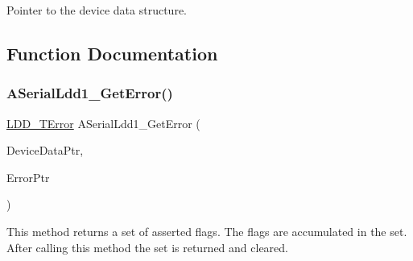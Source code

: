 Pointer to the device data structure. 

\subsection{Function Documentation}
\mbox{\label{group___a_serial_ldd1__module_gaac860ccc68e9f89fb25d97ae0c56bd87}} 
\subsubsection{\texorpdfstring{A\+Serial\+Ldd1\+\_\+\+Get\+Error()}{ASerialLdd1\_GetError()}}
{\footnotesize\ttfamily \hyperlink{group___p_e___types__module_ga24c2b045fd04e79e85f261ce4df35588}{L\+D\+D\+\_\+\+T\+Error} A\+Serial\+Ldd1\+\_\+\+Get\+Error (\begin{DoxyParamCaption}\item[{\hyperlink{group___p_e___types__module_gac5cf1362f1f0e3a2ce71b1bf2276d091}{L\+D\+D\+\_\+\+T\+Device\+Data} $\ast$}]{Device\+Data\+Ptr,  }\item[{\hyperlink{group___p_e___types__module_ga3bd5d57e02458ce220540d0ad0462e06}{L\+D\+D\+\_\+\+S\+E\+R\+I\+A\+L\+\_\+\+T\+Error} $\ast$}]{Error\+Ptr }\end{DoxyParamCaption})}



This method returns a set of asserted flags. The flags are accumulated in the set. After calling this method the set is returned and cleared. 


